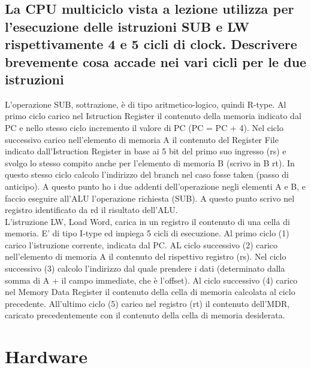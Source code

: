 \documentclass[italian]{article}
\begin{document}
	\subsection{La CPU multiciclo vista a lezione utilizza per l’esecuzione delle istruzioni SUB e LW rispettivamente 4 e 5 cicli di clock. Descrivere brevemente cosa accade nei vari cicli per le due istruzioni}
	L’operazione SUB, sottrazione, è di tipo aritmetico-logico, quindi R-type. Al primo ciclo carico nel Istruction Register il contenuto della memoria indicato dal PC e nello stesso ciclo incremento il valore di PC (PC = PC + 4). Nel ciclo successivo carico nell’elemento di memoria A il contenuto del Register File indicato dall'Istruction Register in base ai 5 bit del primo suo ingresso (rs) e svolgo lo stesso compito anche per l’elemento di memoria B (scrivo in B rt). In questo stesso ciclo calcolo l’indirizzo del branch nel caso fosse taken (passo di anticipo). A questo punto ho i due addenti dell’operazione negli elementi A e B, e faccio eseguire all’ALU l’operazione richiesta (SUB). A questo punto scrivo nel registro identificato da rd il risultato dell’ALU.\\[2mm]
	L'istruzione LW, Load Word, carica in un registro il contenuto di una cella di memoria. E' di tipo I-type ed impiega 5 cicli di esecuzione. Al primo ciclo (1) carico l'istruzione corrente, indicata dal PC. AL ciclo successivo (2) carico nell'elemento di memoria A il contenuto del rispettivo registro (rs). Nel ciclo successivo (3) calcolo l'indirizzo dal quale prendere i dati (determinato dalla somma di A + il campo immediate, che è l'offset). Al ciclo successivo (4) carico nel Memory Data Register il contenuto della cella di memoria calcolata al ciclo precedente. All'ultimo ciclo (5) carico nel registro (rt) il contenuto dell'MDR, caricato precedentemente con il contenuto della cella di memoria desiderata.
	
	\newpage
	\section{Hardware}
\end{document}
